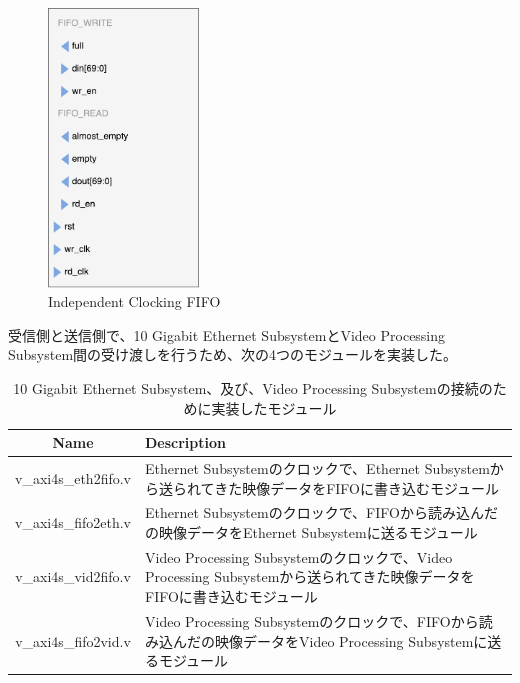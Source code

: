 \begin{figure}[htbp]
  \begin{center}
    \includegraphics[bb=0 0 201 371,width=4cm]{img/fpga-independent-clocking-fifo.pdf}
  \end{center}
  \caption{Independent Clocking FIFO}
  \label{fig:fpga-independent-clocking-fifo}
\end{figure}

受信側と送信側で、10 Gigabit Ethernet SubsystemとVideo Processing Subsystem間の受け渡しを行うため、次の4つのモジュールを実装した。

\begin{table}[htbp]
  \caption{10 Gigabit Ethernet Subsystem、及び、Video Processing Subsystemの接続のために実装したモジュール}
  \label{tb:fpga-implement-modules}
  \begin{center}
  \begin{tabular}{c|p{12cm}}
    \hline
    Name               & Description \\\hline\hline
    v\_axi4s\_eth2fifo.v & Ethernet Subsystemのクロックで、Ethernet Subsystemから送られてきた映像データをFIFOに書き込むモジュール \\\hline
    v\_axi4s\_fifo2eth.v & Ethernet Subsystemのクロックで、FIFOから読み込んだの映像データをEthernet Subsystemに送るモジュール \\\hline
    v\_axi4s\_vid2fifo.v & Video Processing Subsystemのクロックで、Video Processing Subsystemから送られてきた映像データをFIFOに書き込むモジュール \\\hline
    v\_axi4s\_fifo2vid.v & Video Processing Subsystemのクロックで、FIFOから読み込んだの映像データをVideo Processing Subsystemに送るモジュール \\\hline
  \end{tabular}\end{center}
\end{table}

